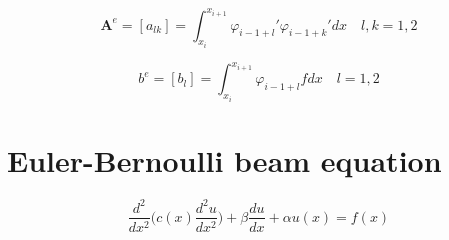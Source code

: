 \documentclass{article}
\begin{document}
\begin{equation*}
    \textbf{A}^e=[a_{lk}]=\int_{x_i}^{x_{i+1}} \varphi_{i-1+l}' \varphi_{i-1+k}' dx \quad
     l,k=1,2  
\end{equation*}

\begin{equation*}
    b^e=[b_{l}]=\int_{x_i}^{x_{i+1}} \varphi_{i-1+l} f dx \quad
     l=1,2  
\end{equation*}

\section{Euler-Bernoulli beam equation}

\begin{equation}
    \frac{d^2}{dx^2}\Big( c(x) \frac{d^2 u}{dx^2} \Big) + \beta \frac{du}{dx} + \alpha u(x)= f(x)
\end{equation}
\end{document}

